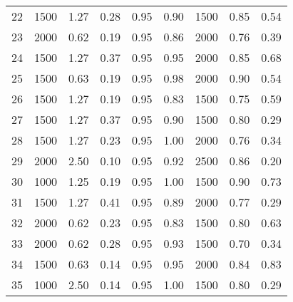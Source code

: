 \begin{tabular}{lrrrrrrrr}
22 &  1500 &  1.27 &  0.28 &  0.95 &  0.90 &  1500 &  0.85 &  0.54 \\
23 &  2000 &  0.62 &  0.19 &  0.95 &  0.86 &  2000 &  0.76 &  0.39 \\
24 &  1500 &  1.27 &  0.37 &  0.95 &  0.95 &  2000 &  0.85 &  0.68 \\
25 &  1500 &  0.63 &  0.19 &  0.95 &  0.98 &  2000 &  0.90 &  0.54 \\
26 &  1500 &  1.27 &  0.19 &  0.95 &  0.83 &  1500 &  0.75 &  0.59 \\
27 &  1500 &  1.27 &  0.37 &  0.95 &  0.90 &  1500 &  0.80 &  0.29 \\
28 &  1500 &  1.27 &  0.23 &  0.95 &  1.00 &  2000 &  0.76 &  0.34 \\
29 &  2000 &  2.50 &  0.10 &  0.95 &  0.92 &  2500 &  0.86 &  0.20 \\
30 &  1000 &  1.25 &  0.19 &  0.95 &  1.00 &  1500 &  0.90 &  0.73 \\
31 &  1500 &  1.27 &  0.41 &  0.95 &  0.89 &  2000 &  0.77 &  0.29 \\
32 &  2000 &  0.62 &  0.23 &  0.95 &  0.83 &  1500 &  0.80 &  0.63 \\
33 &  2000 &  0.62 &  0.28 &  0.95 &  0.93 &  1500 &  0.70 &  0.34 \\
34 &  1500 &  0.63 &  0.14 &  0.95 &  0.95 &  2000 &  0.84 &  0.83 \\
35 &  1000 &  2.50 &  0.14 &  0.95 &  1.00 &  1500 &  0.80 &  0.29 \\
\bottomrule
\end{tabular}
